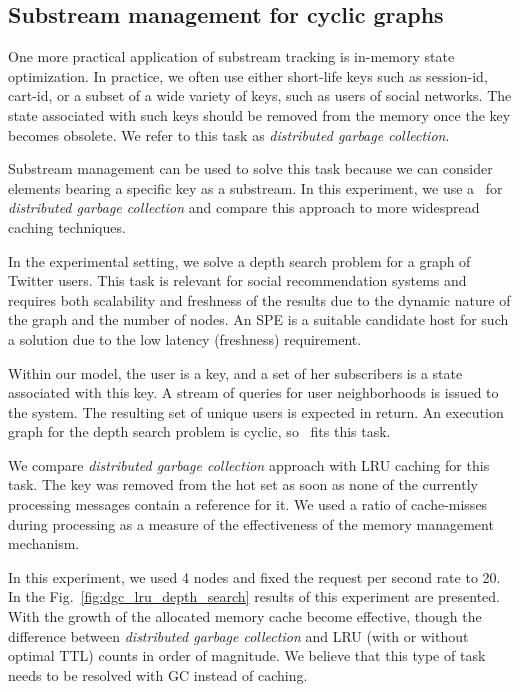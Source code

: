 \subsection{Substream management for cyclic graphs}

One more practical application of substream tracking is in-memory state optimization. In practice, we often use either short-life keys such as session-id, cart-id, or a subset of a wide variety of keys, such as users of social networks. The state associated with such keys should be removed from the memory once the key becomes obsolete. We refer to this task as \textit{distributed garbage collection}.

Substream management can be used to solve this task because we can consider elements bearing a specific key as a substream. In this experiment, we use a \tracker\ for \textit{distributed garbage collection} and compare this approach to more widespread caching techniques.

In the experimental setting, we solve a depth search problem for a graph of Twitter users. This task is relevant for social recommendation systems and requires both scalability and freshness of the results due to the dynamic nature of the graph and the number of nodes. An SPE is a suitable candidate host for such a solution due to the low latency (freshness) requirement. 

Within our model, the user is a key, and a set of her subscribers is a state associated with this key. A stream of queries for user neighborhoods is issued to the system. The resulting set of unique users is expected in return. An execution graph for the depth search problem is cyclic, so \tracker\ fits this task. 

We compare \textit{distributed garbage collection} approach with LRU caching for this task. The key was removed from the hot set as soon as none of the currently processing messages contain a reference for it. We used a ratio of cache-misses during processing as a measure of the effectiveness of the memory management mechanism. 

In this experiment, we used 4 nodes and fixed the request per second rate to 20. In the Fig.~\ref{fig:dgc_lru_depth_search} results of this experiment are presented. With the growth of the allocated memory cache become effective, though the difference between 
\textit{distributed garbage collection} and LRU (with or without optimal TTL) counts in order of magnitude. We believe that this type of task needs to be resolved with GC instead of caching.
